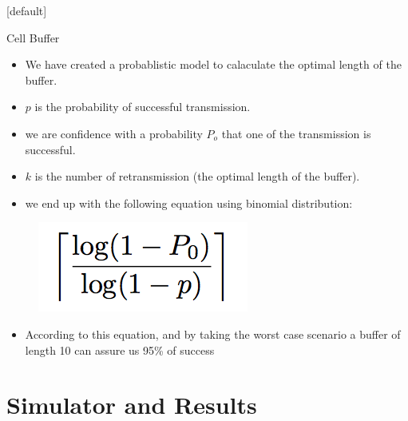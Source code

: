 \documentclass{beamer}
\makeatletter
\newenvironment{withoutheadline}{
        \setbeamertemplate{headline}[default]
        \def\beamer@entrycode{\vspace*{-\headheight}}
    }{}
\makeatother
\begin{document}
\begin{withoutheadline}
\begin{frame}{Cell Buffer}

\begin{itemize}
    \item We have created a probablistic model to calaculate the optimal length of the buffer.
    \item<2-> $p$ is the probability of successful transmission.
    \item<3-> we are confidence with a probability $P_{o}$ that one of the transmission is successful.
    \item<4-> $k$ is the number of retransmission (the optimal length of the buffer). 
    \item<5-> we end up with the following equation using binomial distribution:
    
    \end{itemize}
    
 \centering
\begin{figure}[p]

\item<5-> \includegraphics[width=0.3\linewidth]{9nq6n.png}
\end{figure}
\begin{itemize}
\item<6-> According to this equation, and by taking the worst case scenario a buffer of length 10 can assure us 95\% of success
 \end{itemize}
\end{frame}
\end{withoutheadline}

\section{Simulator and Results}
\end{document}
